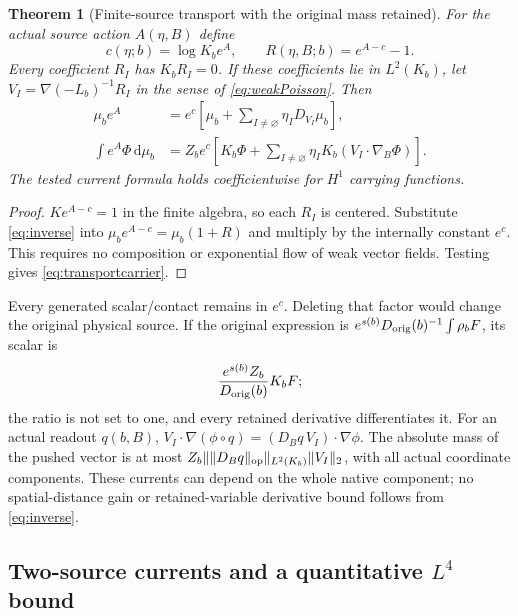 \documentclass[11pt,letterpaper]{article}
\theoremstyle{plain}
\newtheorem{theorem}{Theorem}[section]
\theoremstyle{remark}\newtheorem{remark}[theorem]{Scope}
\newcommand{\dd}{\,\mathrm d}\newcommand{\OH}{\mathcal O_H}
\begin{document}
\begin{theorem}[Finite-source transport with the original mass retained]
\label{thm:Poissontransport}
For the actual source action $A(\eta,B)$ define
\begin{equation}
c(\eta;b)=\log K_b e^A,\qquad R(\eta,B;b)=e^{A-c}-1.
\label{eq:centeredsource}
\end{equation}
Every coefficient $R_I$ has $K_bR_I=0$. If these coefficients lie in $L^2(K_b)$,
let $V_I=\nabla(-L_b)^{-1}R_I$ in the sense of \eqref{eq:weakPoisson}. Then
\begin{align}
\mu_be^A&=e^c\left[\mu_b+\sum_{I\ne\varnothing}\eta_I D_{V_I}\mu_b\right],
\label{eq:transportdensity}\\
\int e^A\Phi\dd\mu_b
&=Z_be^c\left[K_b\Phi+\sum_{I\ne\varnothing}\eta_I
K_b(V_I\cdot\nabla_B\Phi)\right].
\label{eq:transportcarrier}
\end{align}
The tested current formula holds coefficientwise for $H^1$ carrying functions.
\end{theorem}
\begin{proof}
$Ke^{A-c}=1$ in the finite algebra, so each $R_I$ is centered. Substitute
\eqref{eq:inverse} into $\mu_be^{A-c}=\mu_b(1+R)$ and multiply by the
internally constant $e^c$. This requires no composition or exponential flow of
weak vector fields. Testing gives \eqref{eq:transportcarrier}.
\end{proof}

Every generated scalar/contact remains in $e^c$. Deleting that factor would
change the original physical source. If the original expression is
$e^{s(b)}D_{\rm orig}(b)^{-1}\int\rho_bF$, its scalar is
\begin{equation}
\frac{e^{s(b)}Z_b}{D_{\rm orig}(b)}K_bF;
\label{eq:absolutescalar}
\end{equation}
the ratio is not set to one, and every retained derivative differentiates it.
For an actual readout $q(b,B)$,
$V_I\cdot\nabla(\phi\circ q)=(D_Bq\,V_I)\cdot\nabla\phi$.
The absolute mass of the pushed vector is at most
$Z_b\|\|D_Bq\|_{\rm op}\|_{L^2(K_b)}\|V_I\|_2$, with all actual coordinate components.
These currents can depend on the whole native component; no spatial-distance
gain or retained-variable derivative bound follows from \eqref{eq:inverse}.

\subsection{Two-source currents and a quantitative $L^4$ bound}
\end{document}
